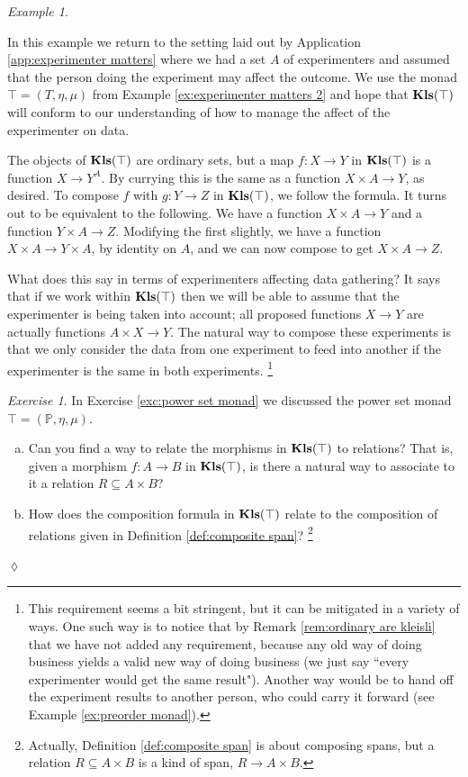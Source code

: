 \documentclass{book}
\def\PP{{\mathbb P}}
\def\to{\rightarrow}
\def\taking{\colon}
\def\ss{\subseteq}
\def\Kls{{\bf Kls}}
\theoremstyle{remark}
\newtheorem{example}[subsubsection]{Example}
\newtheorem{exc}[subsubsection]{Exercise}
\newenvironment{exercise}{\begin{exc}}{\hspace*{\fill}$\lozenge$\end{exc}}
\theoremstyle{definition}
\def\sexc{\begin{enumerate}[a.)]\setlength{\itemsep}{.1cm}\setlength{\parskip}{.1cm}\item}
\def\next{\item}
\def\endsexc{\end{enumerate}}
\begin{document}
\begin{example}\label{ex:experimenter matters 3}

In this example we return to the setting laid out by Application \ref{app:experimenter matters} where we had a set $A$ of experimenters and assumed that the person doing the experiment may affect the outcome. We use the monad $\top=(T,\eta,\mu)$ from Example \ref{ex:experimenter matters 2} and hope that $\Kls(\top)$ will conform to our understanding of how to manage the affect of the experimenter on data.

The objects of $\Kls(\top)$ are ordinary sets, but a map $f\taking X\to Y$ in $\Kls(\top)$ is a function $X\to Y^A$. By currying this is the same as a function $X\times A\to Y$, as desired. To compose $f$ with $g\taking Y\to Z$ in $\Kls(\top)$, we follow the formula. It turns out to be equivalent to the following. We have a function $X\times A\to Y$ and a function $Y\times A\to Z$. Modifying the first slightly, we have a function $X\times A\to Y\times A$, by identity on $A$, and we can now compose to get $X\times A\to Z$.

What does this say in terms of experimenters affecting data gathering? It says that if we work within $\Kls(\top)$ then we will be able to assume that the experimenter is being taken into account; all proposed functions $X\to Y$ are actually functions $A\times X\to Y$. The natural way to compose these experiments is that we only consider the data from one experiment to feed into another if the experimenter is the same in both experiments.
\footnote{This requirement seems a bit stringent, but it can be mitigated in a variety of ways. One such way is to notice that by Remark \ref{rem:ordinary are kleisli} that we have not added any requirement, because any old way of doing business yields a valid new way of doing business (we just say ``every experimenter would get the same result"). Another way would be to hand off the experiment results to another person, who could carry it forward (see Example \ref{ex:preorder monad}).}

\end{example}

\begin{exercise}\label{exc:kleisli powerset relations}
In Exercise \ref{exc:power set monad} we discussed the power set monad $\top=(\PP,\eta,\mu)$.
\sexc Can you find a way to relate the morphisms in $\Kls(\top)$ to relations? That is, given a morphism $f\taking A\to B$ in $\Kls(\top)$, is there a natural way to associate to it a relation $R\ss A\times B$?
\next How does the composition formula in $\Kls(\top)$ relate to the composition of relations given in Definition \ref{def:composite span}?
\footnote{Actually, Definition \ref{def:composite span} is about composing spans, but a relation $R\ss A\times B$ is a kind of span, $R\to A\times B$.}
\endsexc
\end{exercise}
\end{document}
